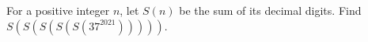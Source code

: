 For a positive integer $n$, let $S(n)$ be the sum of its decimal digits. Find $S(S(S(S(S(37^{2021})))))$.
